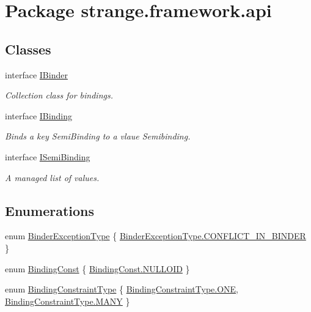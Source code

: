 \hypertarget{namespacestrange_1_1framework_1_1api}{\section{Package strange.\-framework.\-api}
\label{namespacestrange_1_1framework_1_1api}
}
\subsection*{Classes}
\begin{DoxyCompactItemize}
\item 
interface \hyperlink{interfacestrange_1_1framework_1_1api_1_1_i_binder}{I\-Binder}
\begin{DoxyCompactList}\small\item\em Collection class for bindings. \end{DoxyCompactList}\item 
interface \hyperlink{interfacestrange_1_1framework_1_1api_1_1_i_binding}{I\-Binding}
\begin{DoxyCompactList}\small\item\em Binds a key Semi\-Binding to a vlaue Semibinding. \end{DoxyCompactList}\item 
interface \hyperlink{interfacestrange_1_1framework_1_1api_1_1_i_semi_binding}{I\-Semi\-Binding}
\begin{DoxyCompactList}\small\item\em A managed list of values. \end{DoxyCompactList}\end{DoxyCompactItemize}
\subsection*{Enumerations}
\begin{DoxyCompactItemize}
\item 
enum \hyperlink{namespacestrange_1_1framework_1_1api_ae9308e863579d2ca38f2729e1104dac9}{Binder\-Exception\-Type} \{ \hyperlink{namespacestrange_1_1framework_1_1api_ae9308e863579d2ca38f2729e1104dac9a2972874028843b51bde733339d5cf74a}{Binder\-Exception\-Type.\-C\-O\-N\-F\-L\-I\-C\-T\-\_\-\-I\-N\-\_\-\-B\-I\-N\-D\-E\-R}
 \}
\item 
enum \hyperlink{namespacestrange_1_1framework_1_1api_adcc058ca6ff0fe013ffdbf63ada74a97}{Binding\-Const} \{ \hyperlink{namespacestrange_1_1framework_1_1api_adcc058ca6ff0fe013ffdbf63ada74a97a5f32587ea07e2a7ad41b7461e159da30}{Binding\-Const.\-N\-U\-L\-L\-O\-I\-D}
 \}
\item 
enum \hyperlink{namespacestrange_1_1framework_1_1api_a9819c5ab6d03a2cbce2d3dddf5264e42}{Binding\-Constraint\-Type} \{ \hyperlink{namespacestrange_1_1framework_1_1api_a9819c5ab6d03a2cbce2d3dddf5264e42abc21e6484530fc9d0313cb816b733396}{Binding\-Constraint\-Type.\-O\-N\-E}, 
\hyperlink{namespacestrange_1_1framework_1_1api_a9819c5ab6d03a2cbce2d3dddf5264e42a914afc10e7ea496e240a80be1bc01d09}{Binding\-Constraint\-Type.\-M\-A\-N\-Y}
 \}
\end{DoxyCompactItemize}



